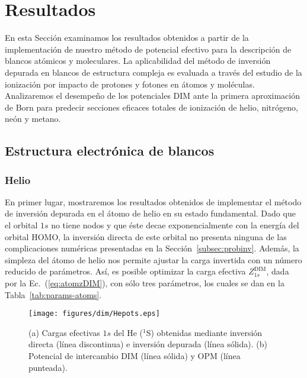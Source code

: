 \section{Resultados}
\label{sec:dimresultados}

En esta Sección examinamos los resultados obtenidos a partir de la 
implementación de nuestro método de potencial efectivo para la 
descripción de blancos atómicos y moleculares. La aplicabilidad del 
método de inversión depurada en blancos de estructura compleja es 
evaluada a través del estudio de la ionización por impacto de protones y 
fotones en átomos y moléculas. Analizaremos el desempeño de los  
potenciales DIM ante la primera aproximación de Born para predecir 
secciones eficaces totales de ionización de helio, nitrógeno, neón y 
metano.

\subsection{Estructura electrónica de blancos}
\label{subsec:dimtarget}

\subsubsection*{Helio}

En primer lugar, mostraremos los resultados obtenidos de implementar
el método de inversión depurada en el átomo de helio en su estado
fundamental. Dado que el orbital $1s$ no tiene nodos y que éste 
decae exponencialmente con la energía del orbital HOMO, la inversión 
directa de este orbital no presenta ninguna de las complicaciones 
numéricas presentadas en la Sección~\ref{subsec:probinv}. Además, la 
simpleza del átomo de helio nos permite ajustar la carga invertida con 
un número reducido de parámetros. Así, es posible optimizar la carga 
efectiva $Z_{1s}^{\mathrm{ DIM}}$, dada por la Ec.~(\ref{eq:atomzDIM}), 
con sólo tres parámetros, los cuales se dan en la 
Tabla~\ref{tab:params-atoms}.

\begin{figure}[t]
\centering
\texttt{[image: figures/dim/Hepots.eps]}
\caption[Cargas efectivas y potencial de intercambio DIM de He.]
{(a) Cargas efectivas $1s$ del He ($^1$S) obtenidas mediante inversión 
directa (línea discontinua) e inversión depurada (línea sólida). 
(b) Potencial de intercambio DIM (línea sólida) y OPM (línea punteada).}
\label{fig:Hepots}
\end{figure}

